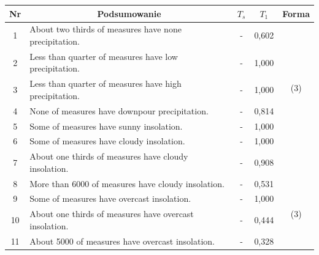 \documentclass{classrep}
\begin{document}
\begin{table}[H]
\begin{center}
\begin{tabularx}{\linewidth}{ |c|X|c|c|c| } 
\hline
Nr & \multicolumn{1}{|c|}{Podsumowanie} & $T_s$ & $T_1$ & Forma \\
\hline
1	&	About two thirds of measures have none precipitation.	&	-	&	0,602 & \multirow{4}{1em}{\newline\newline\newline(3)} \\ \cline{1-4}
2	&	Less than quarter of measures have low precipitation.	&	-	&	1,000	& \\	\cline{1-4}
3	&	Less than quarter of measures have high precipitation.	&	-	&	1,000	& \\	\cline{1-4}
4	&	None of measures have downpour precipitation.	&	-	&	0,814	& \\
\hline
\hline
5	&	Some of measures have sunny insolation.	&	-	&	1,000 &	\multirow{7}{1em}{\newline\newline\newline\newline\newline(3)} \\ \cline{1-4}
6	&	Some of measures have cloudy insolation.	&	-	&	1,000	& \\	\cline{1-4}
7	&	About one thirds of measures have cloudy insolation.	&	-	&	0,908	& \\	\cline{1-4}
8	&	More than 6000 of measures have cloudy insolation.	&	-	&	0,531	& \\	\cline{1-4}
9	&	Some of measures have overcast insolation.	&	-	&	1,000	& \\	\cline{1-4}
10	&	About one thirds of measures have overcast insolation.	&	-	&	0,444	& \\	\cline{1-4}
11	&	About 5000 of measures have overcast insolation.	&	-	&	0,328	& \\	
\hline
\hline


\end{tabularx}
\end{center}
\end{table}
\end{document}
